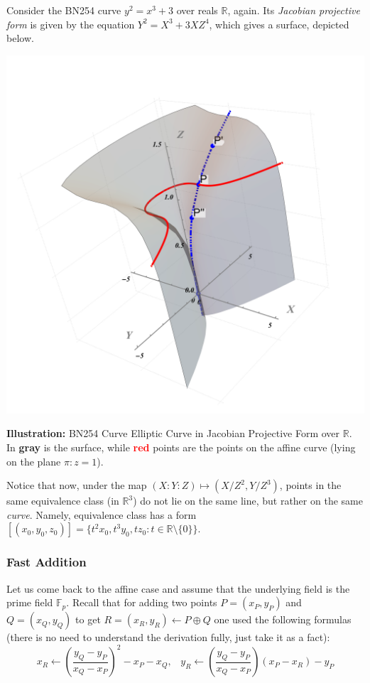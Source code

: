 \documentclass[../lecture-notes.tex]{subfiles}
\begin{document}
\begin{example}
    Consider the BN254 curve $y^2 = x^3 + 3$ over reals $\mathbb{R}$, again. Its \textit{Jacobian projective form} is given by the equation $Y^2 = X^3 + 3XZ^4$, which gives a surface, depicted below.
    \begin{center}
        \includegraphics[trim={275 140 225 100}, width=0.35\linewidth, clip]{images/lecture_4/projective_ec_jacobian.pdf}
        
        \scriptsize{\textbf{Illustration:} BN254 Curve Elliptic Curve in Jacobian Projective Form over $\mathbb{R}$. In \textcolor{black!80}{\textbf{gray}} is the surface, while \textcolor{red}{\textbf{red}} points are the points on the affine curve (lying on the plane $\pi: z=1$).}
    \end{center}

    Notice that now, under the map $(X:Y:Z) \mapsto (X/Z^2,Y/Z^3)$, points in the same equivalence class (in $\mathbb{R}^3$) do not lie on the same line, but rather on the same \textit{curve}. Namely, equivalence class has a form $[(x_0,y_0,z_0)] = \{t^2x_0,t^3y_0,tz_0: t \in \mathbb{R} \setminus \{0\}\}$.
\end{example}

\subsubsection{Fast Addition}

Let us come back to the affine case and assume that the underlying field is the prime field $\mathbb{F}_p$. Recall that for adding two points $P=(x_P,y_P)$ and $Q=(x_Q,y_Q)$ to get $R=(x_R,y_R) \gets P \oplus Q$ one used the following formulas (there is no need to understand the derivation fully, just take it as a fact):
\begin{equation}
    x_R \gets \left(\frac{y_Q-y_P}{x_Q-x_P}\right)^2 - x_P - x_Q, \;\;\; y_R \gets \left(\frac{y_Q-y_P}{x_Q-x_P}\right)(x_P-x_R) - y_P
\end{equation}
\end{document}
